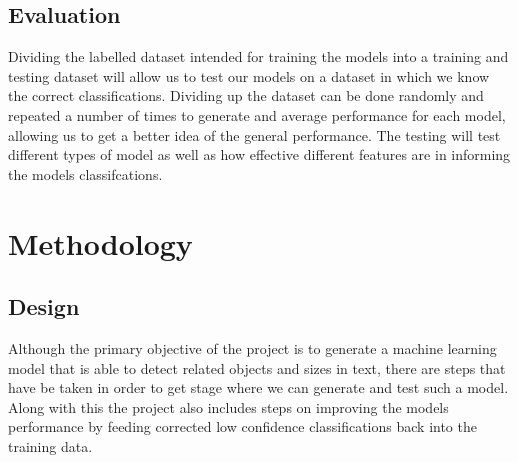 \documentclass[11pt,oneside]{book}
\begin{document}
\section{Evaluation}
Dividing the labelled dataset intended for training the models into a training and testing dataset will allow us to test our models on a dataset in which we know the correct classifications. Dividing up the dataset can be done randomly and repeated a number of times to generate and average performance for each model, allowing us to get a better idea of the general performance. The testing will test different types of model as well as how effective different features are in informing the models classifcations.

\chapter{Methodology}
\section{Design}
Although the primary objective of the project is to generate a machine learning model that is able to detect related objects and sizes in text, there are steps that have be taken in order to get stage where we can generate and test such a model. Along with this the project also includes steps on improving the models performance by feeding corrected low confidence classifications back into the training data.
\end{document}
